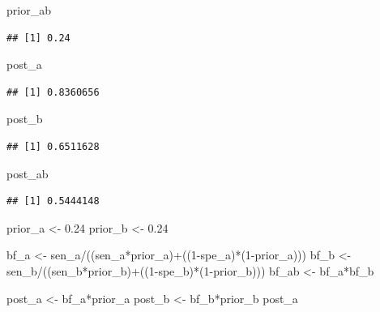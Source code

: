 \documentclass[
  10pt,
  dvipsnames,enabledeprecatedfontcommands]{scrartcl}
\newenvironment{Shaded}{\begin{snugshade}}{\end{snugshade}}
\newcommand{\DecValTok}[1]{\textcolor[rgb]{0.00,0.00,0.81}{#1}}
\newcommand{\FloatTok}[1]{\textcolor[rgb]{0.00,0.00,0.81}{#1}}
\newcommand{\NormalTok}[1]{#1}
\newcommand{\OtherTok}[1]{\textcolor[rgb]{0.56,0.35,0.01}{#1}}
\newcommand{\SpecialCharTok}[1]{\textcolor[rgb]{0.00,0.00,0.00}{#1}}
\begin{document}
\begin{Shaded}
\begin{Highlighting}[]
\NormalTok{prior\_ab}
\end{Highlighting}
\end{Shaded}

\begin{verbatim}
## [1] 0.24
\end{verbatim}

\begin{Shaded}
\begin{Highlighting}[]
\NormalTok{post\_a}
\end{Highlighting}
\end{Shaded}

\begin{verbatim}
## [1] 0.8360656
\end{verbatim}

\begin{Shaded}
\begin{Highlighting}[]
\NormalTok{post\_b}
\end{Highlighting}
\end{Shaded}

\begin{verbatim}
## [1] 0.6511628
\end{verbatim}

\begin{Shaded}
\begin{Highlighting}[]
\NormalTok{post\_ab}
\end{Highlighting}
\end{Shaded}

\begin{verbatim}
## [1] 0.5444148
\end{verbatim}

\begin{Shaded}
\begin{Highlighting}[]
\NormalTok{prior\_a }\OtherTok{\textless{}{-}} \FloatTok{0.24}
\NormalTok{prior\_b }\OtherTok{\textless{}{-}} \FloatTok{0.24}

\NormalTok{bf\_a }\OtherTok{\textless{}{-}}\NormalTok{ sen\_a}\SpecialCharTok{/}\NormalTok{((sen\_a}\SpecialCharTok{*}\NormalTok{prior\_a)}\SpecialCharTok{+}\NormalTok{((}\DecValTok{1}\SpecialCharTok{{-}}\NormalTok{spe\_a)}\SpecialCharTok{*}\NormalTok{(}\DecValTok{1}\SpecialCharTok{{-}}\NormalTok{prior\_a)))}
\NormalTok{bf\_b }\OtherTok{\textless{}{-}}\NormalTok{ sen\_b}\SpecialCharTok{/}\NormalTok{((sen\_b}\SpecialCharTok{*}\NormalTok{prior\_b)}\SpecialCharTok{+}\NormalTok{((}\DecValTok{1}\SpecialCharTok{{-}}\NormalTok{spe\_b)}\SpecialCharTok{*}\NormalTok{(}\DecValTok{1}\SpecialCharTok{{-}}\NormalTok{prior\_b)))}
\NormalTok{bf\_ab }\OtherTok{\textless{}{-}}\NormalTok{ bf\_a}\SpecialCharTok{*}\NormalTok{bf\_b}

\NormalTok{post\_a }\OtherTok{\textless{}{-}}\NormalTok{ bf\_a}\SpecialCharTok{*}\NormalTok{prior\_a}
\NormalTok{post\_b }\OtherTok{\textless{}{-}}\NormalTok{ bf\_b}\SpecialCharTok{*}\NormalTok{prior\_b}
\NormalTok{post\_a}
\end{Highlighting}
\end{Shaded}
\end{document}
